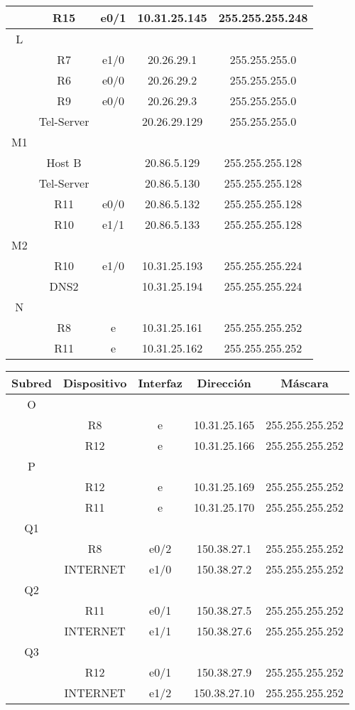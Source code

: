 \documentclass[12pt,a4paper,spanish]{article}
\begin{document}
\begin{tabular}{|c|c|c|c|c|}
	\hline
	  & R15 & e0/1 & 10.31.25.145 & 255.255.255.248 \\
	\hline
	\hline
	L & & & & \\
	\hline
	  & R7 & e1/0 & 20.26.29.1 & 255.255.255.0 \\
	\hline
	  & R6 & e0/0 & 20.26.29.2 & 255.255.255.0 \\
	\hline
	  & R9 & e0/0 & 20.26.29.3 & 255.255.255.0 \\
	\hline
	  & Tel-Server & & 20.26.29.129 & 255.255.255.0 \\
	\hline
	\hline
	M1 & & & & \\
	\hline
	  & Host B & & 20.86.5.129 & 255.255.255.128 \\
	\hline
	  & Tel-Server & & 20.86.5.130 & 255.255.255.128 \\
	\hline
	  & R11 & e0/0 & 20.86.5.132 & 255.255.255.128 \\
	\hline
	  & R10 & e1/1 & 20.86.5.133 & 255.255.255.128 \\
	\hline
	\hline
	M2 & & & & \\
	\hline
	  & R10 & e1/0 & 10.31.25.193 & 255.255.255.224 \\
	\hline
	  & DNS2 & & 10.31.25.194 & 255.255.255.224 \\
	\hline
	\hline
	N & & & & \\
	\hline
	  & R8 & e & 10.31.25.161 & 255.255.255.252 \\
	\hline
	  & R11 & e & 10.31.25.162 & 255.255.255.252 \\
	\hline
\end{tabular}
\newpage
\begin{tabular}{|c|c|c|c|c|}
	\hline
	Subred & Dispositivo & Interfaz & Dirección & Máscara\\
	\hline
	\hline
	O & & & & \\
	\hline
	  & R8 & e & 10.31.25.165 & 255.255.255.252 \\
	\hline
	  & R12 & e & 10.31.25.166 & 255.255.255.252 \\
	\hline
	\hline
	P & & & & \\
	\hline
	  & R12 & e & 10.31.25.169 & 255.255.255.252 \\
	\hline
	  & R11 & e & 10.31.25.170 & 255.255.255.252 \\
	\hline
	Q1 & & & & \\
	\hline
	  & R8 & e0/2 & 150.38.27.1 & 255.255.255.252 \\
	\hline
	  & INTERNET & e1/0 & 150.38.27.2 & 255.255.255.252 \\
	\hline
	Q2 & & & & \\
	\hline
	  & R11 & e0/1 & 150.38.27.5 & 255.255.255.252 \\
	\hline
	  & INTERNET & e1/1 & 150.38.27.6 & 255.255.255.252 \\
	\hline
	Q3 & & & & \\
	\hline
	  & R12 & e0/1 & 150.38.27.9 & 255.255.255.252 \\
	\hline
	  & INTERNET & e1/2 & 150.38.27.10 & 255.255.255.252 \\
	\hline
\end{tabular}
\end{document}

